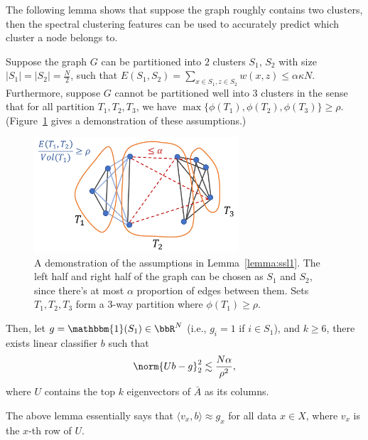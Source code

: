 The following lemma shows that suppose the graph roughly contains two clusters, then the spectral clustering features can be used to accurately predict which cluster a node belongs to.
\begin{lemma}\label{lemma:ssl1}
	Suppose the graph $G$ can be partitioned into $2$ clusters $S_1$, $S_2$ with size $|S_1| = |S_2| = \frac{N}{2}$, such that $E(S_1, S_2)=\sum_{x\in S_1, z\in S_2} w(x, z) \le \alpha \kappa N$. Furthermore, suppose $G$ cannot be partitioned well into $3$ clusters in the sense that for all partition $ T_1, T_2, T_3$, we have $\max\{\phi(T_1), \phi(T_2), \phi(T_3)\} \ge \rho$. (Figure~\ref{figure:ssl_thm_assumption} gives a demonstration of these assumptions.)
	\begin{figure}[ht]
		\centering
		\includegraphics[width=3in]{figures/ssl4.pdf}
		\caption{A demonstration of the assumptions in Lemma~\ref{lemma:ssl1}. The left half and right half of the graph can be chosen as $S_1$ and $S_2$, since there's at most $\alpha$ proportion of edges between them. Sets $T_1, T_2, T_3$ form a 3-way partition where $\phi(T_1)\ge \rho$.
		}\label{figure:ssl_thm_assumption}
	\end{figure}
	Then, let $g=\mathbbm{1}(S_1)\in \bbR^N$ (i.e., $g_i=1$ if $i\in S_1$), and $k\ge 6$, there exists linear classifier $b$ such that 
	\begin{align}
		\norm{Ub-g}_2^2 \lesssim \frac{N\alpha}{\rho^2},
	\end{align}
where $U$ contains the top $k$ eigenvectors of $\bar{A}$ as its columns.
\end{lemma}

The above lemma essentially says that $\langle v_x, b \rangle\approx g_x$ for all data $x\in X$, where $v_x$ is the $x$-th row of $U$. 

